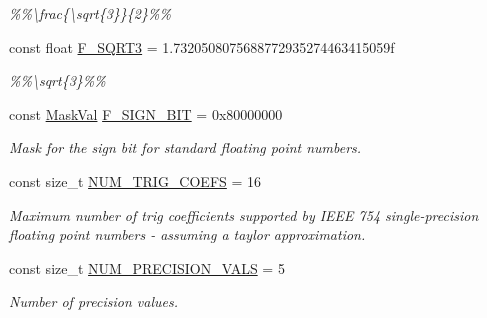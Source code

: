\begin{DoxyCompactItemize}
\begin{DoxyCompactList}\small\item\em \%\%\textbackslash{}frac\{\textbackslash{}sqrt\{3\}\}\{2\}\%\% \end{DoxyCompactList}\item 
\hypertarget{group___scalar_math_consts_ga1e7def1903a3d92805ba4ed841ee1bbf}{}const float \hyperlink{group___scalar_math_consts_ga1e7def1903a3d92805ba4ed841ee1bbf}{F\+\_\+\+S\+Q\+R\+T3} = 1.\+7320508075688772935274463415059f\label{group___scalar_math_consts_ga1e7def1903a3d92805ba4ed841ee1bbf}

\begin{DoxyCompactList}\small\item\em \%\%\textbackslash{}sqrt\{3\}\%\% \end{DoxyCompactList}\item 
const \hyperlink{group___scalar_math_consts_gad991473bd51363f9743013730e68751a}{Mask\+Val} \hyperlink{group___scalar_math_consts_gad2489c06f986e5af29bfb5c2eaca185f}{F\+\_\+\+S\+I\+G\+N\+\_\+\+B\+I\+T} = 0x80000000
\begin{DoxyCompactList}\small\item\em Mask for the sign bit for standard floating point numbers. \end{DoxyCompactList}\item 
const size\+\_\+t \hyperlink{group___scalar_math_consts_ga090f5a34fbed01148a6f72dc1abb00e9}{N\+U\+M\+\_\+\+T\+R\+I\+G\+\_\+\+C\+O\+E\+F\+S} = 16
\begin{DoxyCompactList}\small\item\em Maximum number of trig coefficients supported by I\+E\+E\+E 754 single-\/precision floating point numbers -\/ assuming a taylor approximation. \end{DoxyCompactList}\item 
\hypertarget{group___scalar_math_consts_ga2b78b41d32d14485b997dada705037bb}{}const size\+\_\+t \hyperlink{group___scalar_math_consts_ga2b78b41d32d14485b997dada705037bb}{N\+U\+M\+\_\+\+P\+R\+E\+C\+I\+S\+I\+O\+N\+\_\+\+V\+A\+L\+S} = 5\label{group___scalar_math_consts_ga2b78b41d32d14485b997dada705037bb}

\begin{DoxyCompactList}\small\item\em Number of precision values. \end{DoxyCompactList}\end{DoxyCompactItemize}
